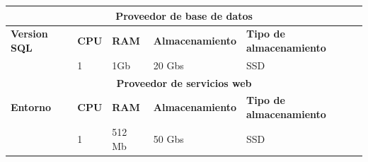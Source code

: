\documentclass[10pt]{article}
\begin{document}
\begin{table}[H]
\centering
\begin{tabular}{|l |l |l |l |l |}
\hline
\multicolumn{5}{|c|}{\textbf{Proveedor de base de datos}} \\
\hline
\centering\textbf{Version SQL} & \textbf{CPU} & \textbf{RAM} & \textbf{Almacenamiento} & \textbf{Tipo de almacenamiento} \\ \hline
\centering{Sqlserver express 14.00.3356.20.v1} & {1} & {1Gb} & {20 Gbs} & {SSD} \\ \hline
\hline
\multicolumn{5}{|c|}{\textbf{Proveedor de servicios web}} \\
\hline
\centering\textbf{Entorno} & \textbf{CPU} & \textbf{RAM} & \textbf{Almacenamiento} & \textbf{Tipo de almacenamiento} \\ \hline
\centering{.NET Core 3.1 (C\#/PowerShell)} & {1} & {512 Mb} & {50 Gbs} & {SSD} \\ \hline
\end{tabular}
\end{table}
\newpage
\end{document}
